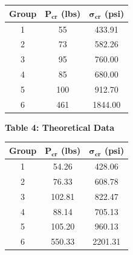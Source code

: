 \documentclass{article}
\begin{document}
\begin{center}
\begin{tabular}{|c c c|}
        \hline
        \textbf{Group} & \textbf{\(\textbf{P}_\textbf{cr}\) (lbs)} & \textbf{\(\bm{\sigma}_\textbf{cr}\) (psi)}  \\\hline
        1     & 55    & 433.91  \\
        2     & 73    & 582.26  \\
        3     & 95    & 760.00  \\
        4     & 85    & 680.00  \\
        5     & 100   & 912.70  \\
        6     & 461   & 1844.00 \\\hline
    \end{tabular}
    \vspace{6mm}
    \newpage
    {\large{\bf Table 4: Theoretical Data\\}}
    \vspace{3mm}
    \begin{tabular}{|c c c|}
        \hline
        \textbf{Group} & \textbf{\(\textbf{P}_\textbf{cr}\) (lbs)} & \textbf{\(\bm{\sigma}_\textbf{cr}\) (psi)}  \\\hline
        1     & 54.26  & 428.06  \\
        2     & 76.33  & 608.78  \\
        3     & 102.81 & 822.47  \\
        4     & 88.14  & 705.13  \\
        5     & 105.20 & 960.13  \\
        6     & 550.33 & 2201.31 \\\hline
    \end{tabular}
    \end{center}
\end{document}
